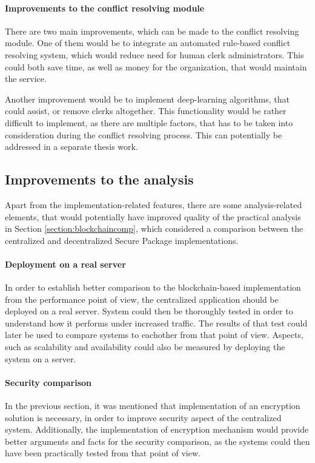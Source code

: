 \paragraph{Improvements to the conflict resolving module}

There are two main improvements, which can be made to the conflict resolving module. One of them would be to integrate an automated rule-based conflict resolving system, which would reduce need for human clerk administrators. This could both save time, as well as money for the organization, that would maintain the service.

Another improvement would be to implement deep-learning algorithms, that could assist, or remove clerks altogether. This functionality would be rather difficult to implement, as there are multiple factors, that has to be taken into consideration during the conflict resolving process. This can potentially be addressed in a separate thesis work.

\pagebreak

\subsection{Improvements to the analysis}

Apart from the implementation-related features, there are some analysis-related elements, that would potentially have improved quality of the practical analysis in Section \ref{section:blockchaincomp}, which considered a comparison between the centralized and decentralized Secure Package implementations.

\paragraph{Deployment on a real server} 
In order to establish better comparison to the blockchain-based implementation from the performance point of view, the centralized application should be deployed on a real server. System could then be thoroughly tested in order to understand how it performs under increased traffic. The results of that test could later be used to compare systems to eachother from that point of view. Aspects, such as scalability and availability could also be measured by deploying the system on a server.

\paragraph{Security comparison}
In the previous section, it was mentioned that implementation of an encryption solution is necessary, in order to improve security aspect of the centralized system. Additionally, the implementation of encryption mechanism would provide better arguments and facts for the security comparison, as the systems could then have been practically tested from that point of view.

